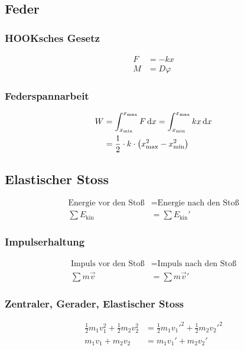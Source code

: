 \newpage
\subsection{Feder}

\begin{multicols}{2}{}
\subsubsection{HOOKsches Gesetz}
\begin{align*}
F&=-kx\\
M&=D\varphi
\end{align*}

\subsubsection{Federspannarbeit}
\begin{align*}
W	&=\int_{x_\text{min}}^{x_\text{max}}F\mathop{}\!\mathrm{d} x=\int_{x_\text{min}}^{x_\text{max}}kx\mathop{}\!\mathrm{d} x\\
	&=\frac{1}{2}\cdot k\cdot \left(x_{\text{max}}^2-x_{\text{min}}^2\right)
\end{align*}
\end{multicols}

\subsection{Elastischer Stoss}

\begin{align*}
\text{Energie vor den Stoß} &= \text{Energie nach den Stoß}\nonumber\\
\sum E_{\text{kin}}&=\sum E_{\text{kin}}'
\end{align*}


\subsubsection{Impulserhaltung}
\begin{align*}
\text{Impuls vor den Stoß} &= \text{Impuls nach den Stoß}\nonumber\\
\sum m\vec{v}&= \sum m\vec{v}'
\end{align*}


\subsubsection{Zentraler, Gerader, Elastischer Stoss}
\begin{align*}
\frac{1}{2}m_1v_1^2+\frac{1}{2}m_2v_2^2&=\frac{1}{2}m_1v_1'^2+\frac{1}{2}m_2v_2'^2\\
m_1v_1+m_2v_2&=m_1v_1'+m_2v_2'
\end{align*}

